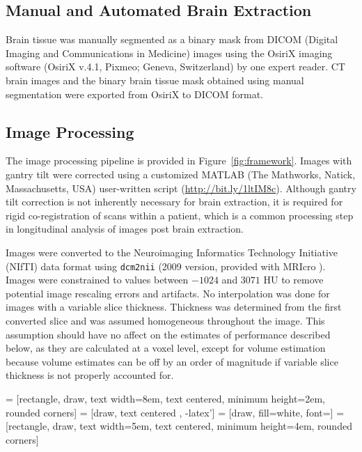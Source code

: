 \documentclass{elsarticle}\usepackage[]{graphicx}\usepackage[]{color}
\begin{document}


\subsection{Manual and Automated Brain Extraction}
Brain tissue was manually segmented as a binary mask from DICOM (Digital Imaging and Communications in Medicine) images using the OsiriX imaging software (OsiriX v.4.1, Pixmeo; Geneva, Switzerland) by one expert reader. 
CT brain images and the binary brain tissue mask obtained using manual segmentation were exported from OsiriX to DICOM format.  

\subsection{Image Processing}
The image processing pipeline is provided in Figure~\ref{fig:framework}.
Images with gantry tilt were corrected using a customized MATLAB (The Mathworks, Natick, Massachusetts, USA) user-written script (\url{http://bit.ly/1ltIM8c}).  Although gantry tilt correction is not inherently necessary for brain extraction, it is required for rigid co-registration of scans within a patient, which is a common processing step in longitudinal analysis of images post brain extraction. 

Images were converted to the Neuroimaging Informatics Technology Initiative (NIfTI) data format using \texttt{dcm2nii} (2009 version, provided with MRIcro \citep{rorden_stereotaxic_2000}).  Images were constrained to values between $-1024$ and $3071$ HU to remove potential image rescaling errors and artifacts.  No interpolation was done for images with a variable slice thickness. Thickness was determined from the first converted slice and was assumed homogeneous throughout the image.  This assumption should have no affect on the estimates of performance described below, as they are calculated at a voxel level, except for volume estimation because volume estimates can be off by an order of magnitude if variable slice thickness is not properly accounted for.


 = [rectangle, draw, text width=8em, text centered, minimum height=2em, rounded corners]
 = [draw, text centered , -latex']
 = [draw, fill=white, font=\tiny ]
 = [rectangle, draw, text width=5em, text centered, minimum height=4em, rounded corners]    
\end{document}
